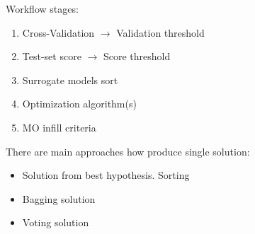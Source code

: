 




Workflow stages:
\begin{enumerate}
    \item Cross-Validation $\rightarrow$ Validation threshold
    \item Test-set score $\rightarrow$ Score threshold
    \item Surrogate models sort
    \item Optimization algorithm(s)
    \item MO infill criteria
\end{enumerate}

There are main approaches how produce single solution: 
\begin{itemize}
    \item Solution from best hypothesis. Sorting
    \item Bagging solution
    \item Voting solution                
\end{itemize}
